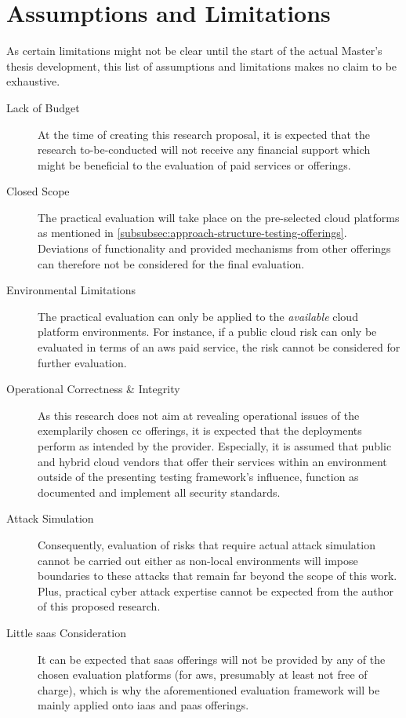 {%

	\section{Assumptions and Limitations} \label{sec:approach-assumptions}
	
	As certain limitations might not be clear until the start of the actual Master's thesis development, this list of assumptions and limitations makes no claim to be exhaustive.
	
	\begin{description}
		\item[Lack of Budget] At the time of creating this research proposal, it is expected that the research to-be-conducted will not receive any financial support which might be beneficial to the evaluation of paid services or offerings.
		\item[Closed Scope] The practical evaluation will take place on the pre-selected cloud platforms as mentioned in \autoref{subsubsec:approach-structure-testing-offerings}. Deviations of functionality and provided mechanisms from other offerings can therefore not be considered for the final evaluation.
		\item[Environmental Limitations] The practical evaluation can only be applied to the \textit{available} cloud platform environments. For instance, if a public cloud risk can only be evaluated in terms of an \ac{aws} paid service, the risk cannot be considered for further evaluation.
		\item[Operational Correctness \& Integrity] As this research does not aim at revealing operational issues of the exemplarily chosen \ac{cc} offerings, it is expected that the deployments perform as intended by the provider. Especially, it is assumed that public and hybrid cloud vendors that offer their services within an environment outside of the presenting testing framework's influence, function as documented and implement all security standards. 
		\item[Attack Simulation] Consequently, evaluation of risks that require actual attack simulation cannot be carried out either as non-local environments will impose boundaries to these attacks that remain far beyond the scope of this work. Plus, practical cyber attack expertise cannot be expected from the author of this proposed research.
		\item[Little \ac{saas} Consideration] It can be expected that \ac{saas} offerings will not be provided by any of the chosen evaluation platforms (for \ac{aws}, presumably at least not free of charge), which is why the aforementioned evaluation framework will be mainly applied onto \ac{iaas} and \ac{paas} offerings.
	\end{description}
	
}
